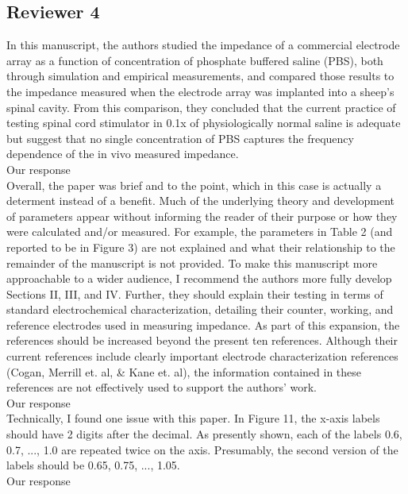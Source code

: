 \documentclass[journal, a4paper]{IEEEtran}
\begin{document}
\subsection*{Reviewer 4}
{\color{blue}
In this manuscript, the authors studied the impedance of a commercial electrode array as a function of concentration of phosphate buffered saline (PBS), both through simulation and empirical measurements, and compared those results to the impedance measured when the electrode array was implanted into a sheep's spinal cavity. From this comparison, they concluded that the current practice of testing spinal cord stimulator in 0.1x of physiologically normal saline is adequate but suggest that no single concentration of PBS captures the frequency dependence of the in vivo measured impedance.\\
{\color{OliveGreen} Our response}\\

Overall, the paper was brief and to the point, which in this case is actually a determent instead of a benefit. Much of the underlying theory and development of parameters appear without informing the reader of their purpose or how they were calculated and/or measured. For example, the parameters in Table 2 (and reported to be in Figure 3) are not explained and what their relationship to the remainder of the manuscript is not provided. To make this manuscript more approachable to a wider audience, I recommend the authors more fully develop Sections II, III, and IV. Further, they should explain their testing in terms of standard electrochemical characterization, detailing their counter, working, and reference electrodes used in measuring impedance. As part of this expansion, the references should be increased beyond the present ten references. Although their current references include clearly important electrode characterization references (Cogan, Merrill et. al, & Kane et. al), the information contained in these references are not effectively used to support the authors’ work.\\
{\color{OliveGreen} Our response}\\

Technically, I found one issue with this paper. In Figure 11, the x-axis labels should have 2 digits after the decimal. As presently shown, each of the labels 0.6, 0.7, ..., 1.0 are repeated twice on the axis. Presumably, the second version of the labels should be 0.65, 0.75, ..., 1.05.\\
{\color{OliveGreen} Our response}\\
}
\end{document}
